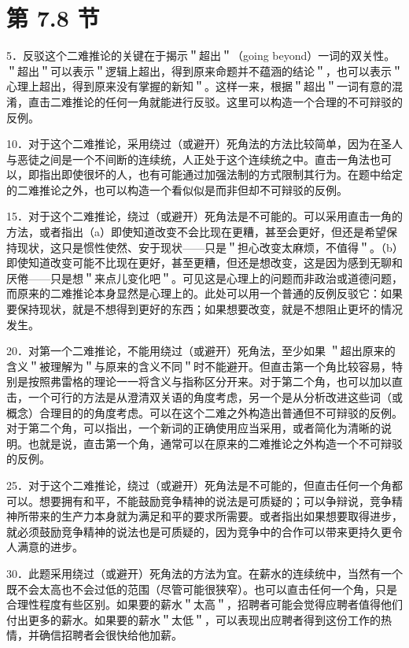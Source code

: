 \section*{第 7.8 节}
5．反驳这个二难推论的关键在于揭示＂超出＂（going beyond）一词的双关性。＂超出＂可以表示＂逻辑上超出，得到原来命题并不蕴涵的结论＂，也可以表示＂心理上超出，得到原来没有掌握的新知＂。这样一来，根据＂超出＂一词有意的混淆，直击二难推论的任何一角就能进行反驳。这里可以构造一个合理的不可辩驳的反例。

10．对于这个二难推论，采用绕过（或避开）死角法的方法比较简单，因为在圣人与恶徒之间是一个不间断的连续统，人正处于这个连续统之中。直击一角法也可以，即指出即使很坏的人，也有可能通过加强法制的方式限制其行为。在题中给定的二难推论之外，也可以构造一个看似似是而非但却不可辩驳的反例。

15．对于这个二难推论，绕过（或避开）死角法是不可能的。可以采用直击一角的方法，或者指出（a）即使知道改变不会比现在更糟，甚至会更好，但还是希望保持现状，这只是惯性使然、安于现状——只是＂担心改变太麻烦，不值得＂。（b）即使知道改变可能不比现在更好，甚至更糟，但还是想改变，这是因为感到无聊和厌倦——只是想＂来点儿变化吧＂。可见这是心理上的问题而非政治或道德问题，而原来的二难推论本身显然是心理上的。此处可以用一个普通的反例反驳它：如果要保持现状，就是不想得到更好的东西；如果想要改变，就是不想阻止更坏的情况发生。

20．对第一个二难推论，不能用绕过（或避开）死角法，至少如果 ＂超出原来的含义＂被理解为＂与原来的含义不同＂时不能避开。但直击第一个角比较容易，特别是按照弗雷格的理论一一将含义与指称区分开来。对于第二个角，也可以加以直击，一个可行的方法是从澄清双关语的角度考虑，另一个是从分析改进这些词（或概念）合理目的的角度考虑。可以在这个二难之外构造出普通但不可辩驳的反例。对于第二个角，可以指出，一个新词的正确使用应当采用，或者简化为清晰的说明。也就是说，直击第一个角，通常可以在原来的二难推论之外构造一个不可辩驳的反例。

25．对于这个二难推论，绕过（或避开）死角法是不可能的，但直击任何一个角都可以。想要拥有和平，不能鼓励竞争精神的说法是可质疑的；可以争辩说，竞争精神所带来的生产力本身就为满足和平的要求所需要。或者指出如果想要取得进步，就必须鼓励竞争精神的说法也是可质疑的，因为竞争中的合作可以带来更持久更令人满意的进步。

30．此题采用绕过（或避开）死角法的方法为宜。在薪水的连续统中，当然有一个既不会太高也不会过低的范围（尽管可能很狭窄）。也可以直击任何一个角，只是合理性程度有些区别。如果要的薪水＂太高＂，招聘者可能会觉得应聘者值得他们付出更多的薪水。如果要的薪水＂太低＂，可以表现出应聘者得到这份工作的热情，并确信招聘者会很快给他加薪。

